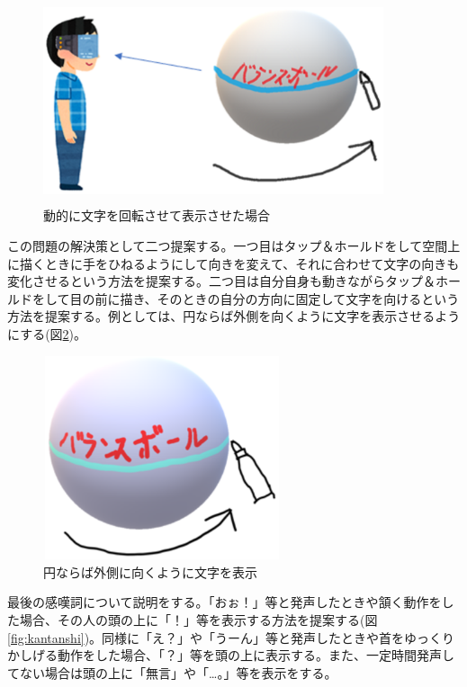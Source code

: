 \documentclass[11pt,a4j, titlepage]{jarticle} %
\begin{document}
\begin{figure}[H]
  \begin{center}
    \includegraphics[clip,height=6.0cm,width=10.0cm]{./moji_douteki.eps}
    \caption{動的に文字を回転させて表示させた場合}
    \label{fig:moji_douteki}
  \end{center}
\end{figure}

この問題の解決策として二つ提案する。一つ目はタップ＆ホールドをして空間上に描くときに手をひねるようにして向きを変えて、それに合わせて文字の向きも変化させるという方法を提案する。二つ目は自分自身も動きながらタップ＆ホールドをして目の前に描き、そのときの自分の方向に固定して文字を向けるという方法を提案する。例としては、円ならば外側を向くように文字を表示させるようにする(図\ref{fig:moji_seiteki})。

\begin{figure}[H]
  \begin{center}
    \includegraphics[clip,height=6.0cm,width=7.0cm]{./moji_seiteki.eps}
    \caption{円ならば外側に向くように文字を表示}
    \label{fig:moji_seiteki}
  \end{center}
\end{figure}

最後の感嘆詞について説明をする。「おぉ！」等と発声したときや頷く動作をした場合、その人の頭の上に「！」等を表示する方法を提案する(図\ref{fig:kantanshi})。同様に「え？」や「うーん」等と発声したときや首をゆっくりかしげる動作をした場合、「？」等を頭の上に表示する。また、一定時間発声してない場合は頭の上に「無言」や「…。」等を表示をする。
\end{document}
